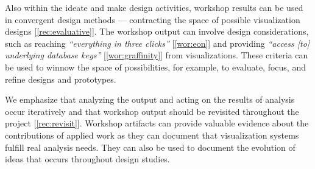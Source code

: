 Also within the ideate and make design activities, workshop results can be used in convergent design methods --- contracting the space of possible visualization designs [\ref{rec:evaluative}]. The workshop output can involve design considerations, such as reaching \emph{``everything in three clicks''} [\ref{wor:eon}] and providing \emph{``access [to] underlying database keys''} [\ref{wor:graffinity}] from visualizations. These criteria can be used to winnow the space of possibilities, for example, to evaluate, focus, and refine designs and prototypes. 

We emphasize that analyzing the output and acting on the results of analysis occur iteratively and that workshop output should be revisited throughout the project [\ref{rec:revisit}]. Workshop artifacts can provide valuable evidence about the contributions of applied work as they can document that visualization systems fulfill real analysis needs. They can also be used to document the evolution of ideas that occurs throughout design studies. 

